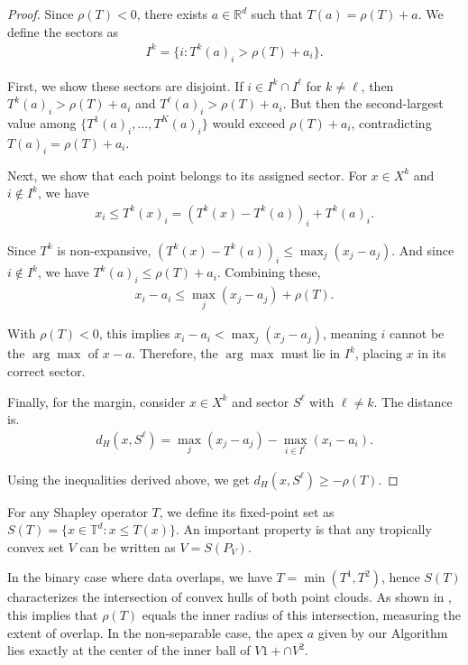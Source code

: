 \documentclass{article}
\newcommand{\R}{\mathbb{R}}
\newcommand{\trop}{\mathbb{T}}
\begin{document}
\begin{proof}
Since $\rho(T) < 0$, there exists $a \in \R^d$ such that $T(a) = \rho(T) + a$. We define the sectors as
\begin{align}
I^k = \{i : T^k(a)_i > \rho(T) + a_i\}.
\end{align}

First, we show these sectors are disjoint. If $i \in I^k \cap I^{\ell}$ for $k \neq \ell$, then $T^k(a)_i > \rho(T) + a_i$ and $T^{\ell}(a)_i > \rho(T) + a_i$. But then the second-largest value among $\{T^1(a)_i,\ldots,T^K(a)_i\}$ would exceed $\rho(T) + a_i$, contradicting $T(a)_i = \rho(T) + a_i$.

Next, we show that each point belongs to its assigned sector. For $x \in X^k$ and $i \not\in I^k$, we have
\begin{align}
x_i \leq T^k(x)_i = (T^k(x) - T^k(a))_i + T^k(a)_i.
\end{align}

Since $T^k$ is non-expansive, $(T^k(x) - T^k(a))_i \leq \max_j(x_j - a_j)$. And since $i \not\in I^k$, we have $T^k(a)_i \leq \rho(T) + a_i$. Combining these,
\begin{align}
x_i - a_i \leq \max_j(x_j - a_j) + \rho(T).
\end{align}

With $\rho(T) < 0$, this implies $x_i - a_i < \max_j(x_j - a_j)$, meaning $i$ cannot be the $\arg\max$ of $x - a$. Therefore, the $\arg\max$ must lie in $I^k$, placing $x$ in its correct sector.

Finally, for the margin, consider $x \in X^k$ and sector $S^{\ell}$ with $\ell \neq k$. The distance is.
\begin{align}
d_H(x, S^{\ell}) = \max_j(x_j - a_j) - \max_{i \in I^{\ell}}(x_i - a_i).
\end{align}

Using the inequalities derived above, we get $d_H(x, S^{\ell}) \geq -\rho(T)$.
\end{proof}

For any Shapley operator $T$, we define its fixed-point set as $S(T) = \{x \in \trop^d : x \leq T(x)\}$. An important property is that any tropically convex set $V$ can be written as $V = S(P_V)$. 

In the binary case where data overlaps, we have $T = \min(T^1, T^2)$, hence $S(T)$ characterizes the intersection of convex hulls of both point clouds. As shown in \cite{akian2020}, this implies that $\rho(T)$ equals the inner radius of this intersection, measuring the extent of overlap. In the non-separable case, the apex $a$ given by our Algorithm lies exactly at the center of the inner ball of $V1+ \cap V^2$.
\end{document}

